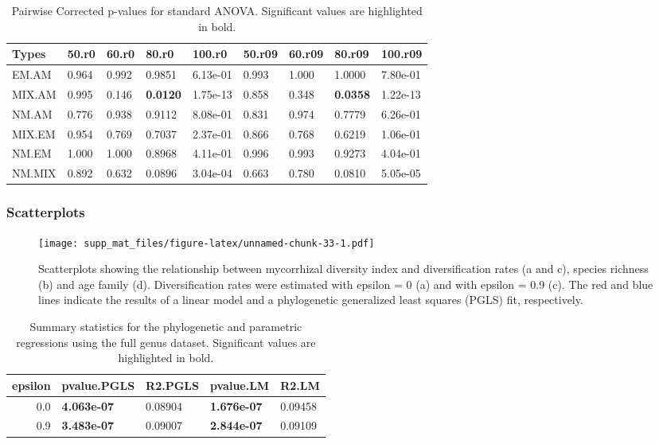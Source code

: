 \documentclass[]{article}
\begin{document}
\begin{table}[H]

\caption{\label{tab:unnamed-chunk-32}Pairwise Corrected p-values for standard ANOVA. Significant values are highlighted in bold.}
\centering
\begin{tabular}{l|l|l|l|l|l|l|l|l}
\hline
Types & 50.r0 & 60.r0 & 80.r0 & 100.r0 & 50.r09 & 60.r09 & 80.r09 & 100.r09\\
\hline
EM.AM & 0.964 & 0.992 & 0.9851 & 6.13e-01 & 0.993 & 1.000 & 1.0000 & 7.80e-01\\
\hline
MIX.AM & 0.995 & 0.146 & \textbf{0.0120} & 1.75e-13 & 0.858 & 0.348 & \textbf{0.0358} & 1.22e-13\\
\hline
NM.AM & 0.776 & 0.938 & 0.9112 & 8.08e-01 & 0.831 & 0.974 & 0.7779 & 6.26e-01\\
\hline
MIX.EM & 0.954 & 0.769 & 0.7037 & 2.37e-01 & 0.866 & 0.768 & 0.6219 & 1.06e-01\\
\hline
NM.EM & 1.000 & 1.000 & 0.8968 & 4.11e-01 & 0.996 & 0.993 & 0.9273 & 4.04e-01\\
\hline
NM.MIX & 0.892 & 0.632 & 0.0896 & 3.04e-04 & 0.663 & 0.780 & 0.0810 & 5.05e-05\\
\hline
\end{tabular}
\end{table}

\hypertarget{scatterplots-1}{%
\subsubsection{Scatterplots}\label{scatterplots-1}}

\begin{figure}
\centering
\texttt{[image: supp\_mat\_files/figure-latex/unnamed-chunk-33-1.pdf]}
\caption{Scatterplots showing the relationship between mycorrhizal
diversity index and diversification rates (a and c), species richness
(b) and age family (d). Diversification rates were estimated with
epsilon = 0 (a) and with epsilon = 0.9 (c). The red and blue lines
indicate the results of a linear model and a phylogenetic generalized
least squares (PGLS) fit, respectively.}
\end{figure}

\begin{table}[H]

\caption{\label{tab:unnamed-chunk-34}Summary statistics for the phylogenetic and parametric regressions using the full genus dataset. Significant values are highlighted in bold.}
\centering
\begin{tabular}{r|l|l|l|l}
\hline
epsilon & pvalue.PGLS & R2.PGLS & pvalue.LM & R2.LM\\
\hline
0.0 & \textbf{4.063e-07} & 0.08904 & \textbf{1.676e-07} & 0.09458\\
\hline
0.9 & \textbf{3.483e-07} & 0.09007 & \textbf{2.844e-07} & 0.09109\\
\hline
\end{tabular}
\end{table}
\end{document}
